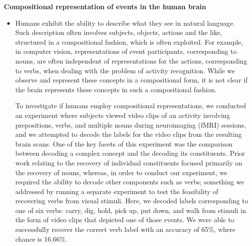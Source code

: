 \documentclass[10pt]{article}
\newenvironment{researchBlock}[1]{%
  \vspace*{0.5ex}
  {\noindent\large \textbf{#1}}
  \begin{itemize}\item}
  {\end{itemize}\vspace{3ex}}
\begin{document}
\begin{researchBlock} {Compositional representation of events in the human brain}
  Humans exhibit the ability to describe what they see in natural language.
  Such description often involves subjects, objects, actions and the like,
  structured in a compositional fashion, which is often exploited.
  For example, in computer vision, representations of event participants,
  corresponding to nouns, are often independent of representations for the
  actions, corresponding to verbs, when dealing with the problem of activity
  recognition.
  While we observe and represent these concepts in a compositional form, it is
  not clear if the brain represents these concepts in such a compositional
  fashion.

  To investigate if humans employ compositional representations, we conducted
  an experiment where subjects viewed video clips of an activity involving
  prepositions, verbs, and multiple nouns during neuroimaging (fMRI) sessions,
  and we attempted to decode the labels for the video clips from the resulting
  brain scans.
  One of the key facets of this experiment was the comparison between decoding
  a complex concept and the decoding its constituents.
  Prior work relating to the recovery of individual constituents focused
  primarily on the recovery of nouns, whereas, in order to conduct our
  experiment, we required the ability to decode other components such as verbs;
  something we addressed by running a separate experiment to test the
  feasibility of recovering verbs from visual stimuli.
  Here, we decoded labels corresponding to one of six verbs: carry, dig, hold,
  pick up, put down, and walk from stimuli in the form of video clips that
  depicted one of those events.
  We were able to successfully recover the correct verb label with an accuracy
  of 65\%, where chance is 16.66\%.


\end{researchBlock}
\end{document}

